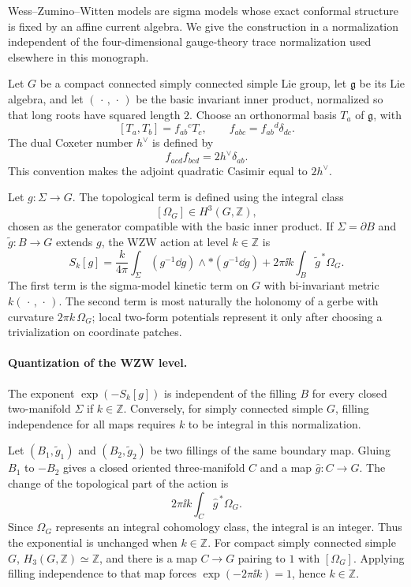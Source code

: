 Wess--Zumino--Witten models are sigma models whose exact conformal structure
is fixed by an affine current algebra.  We give the construction in a
normalization independent of the four-dimensional gauge-theory trace
normalization used elsewhere in this monograph.

Let \(G\) be a compact connected simply connected simple Lie group, let
\(\mathfrak g\) be its Lie algebra, and let \((\,\cdot\,,\,\cdot\,)\) be the
basic invariant inner product, normalized so that long roots have squared
length \(2\).  Choose an orthonormal basis \(T_a\) of \(\mathfrak g\), with
\[
  [T_a,T_b]=f_{ab}{}^{c}T_c,
  \qquad
  f_{abc}=f_{ab}{}^d\delta_{dc}.
\]
The dual Coxeter number \(h^\vee\) is defined by
\begin{equation}
  f_{acd}f_{bcd}=2h^\vee\delta_{ab}.
  \label{eq:wzw-dual-coxeter-normalization}
\end{equation}
This convention makes the adjoint quadratic Casimir equal to \(2h^\vee\).

Let \(g:\Sigma\to G\).  The topological term is defined using the integral
class
\[
  [\Omega_G]\in H^3(G,\mathbb Z),
\]
chosen as the generator compatible with the basic inner product.  If
\(\Sigma=\partial B\) and \(\widetilde g:B\to G\) extends \(g\), the WZW
action at level \(k\in\mathbb Z\) is
\begin{equation}
  S_k[g]
  =
  \frac{k}{4\pi}
  \int_\Sigma
  (g^{-1}\dd g)\wedge * (g^{-1}\dd g)
  +
  2\pi\ii k\int_B \widetilde g^{\,*}\Omega_G .
  \label{eq:wzw-action-coordinate-free}
\end{equation}
The first term is the sigma-model kinetic term on \(G\) with bi-invariant
metric \(k(\,\cdot\,,\,\cdot\,)\).  The second term is most naturally the
holonomy of a gerbe with curvature \(2\pi k\,\Omega_G\); local two-form
potentials represent it only after choosing a trivialization on coordinate
patches.

\paragraph{Quantization of the WZW level.}
The exponent \(\exp(-S_k[g])\) is independent of the filling \(B\) for every
closed two-manifold \(\Sigma\) if \(k\in\mathbb Z\).  Conversely, for simply
connected simple \(G\), filling independence for all maps requires \(k\) to
be integral in this normalization.

Let \((B_1,\widetilde g_1)\) and \((B_2,\widetilde g_2)\) be two fillings of
the same boundary map.  Gluing \(B_1\) to \(-B_2\) gives a closed oriented
three-manifold \(C\) and a map \(\widehat g:C\to G\).  The change of the
topological part of the action is
\[
  2\pi\ii k\int_C\widehat g^{\,*}\Omega_G .
\]
Since \(\Omega_G\) represents an integral cohomology class, the integral is
an integer.  Thus the exponential is unchanged when \(k\in\mathbb Z\).  For
compact simply connected simple \(G\), \(H_3(G,\mathbb Z)\simeq\mathbb Z\),
and there is a map \(C\to G\) pairing to \(1\) with \([\Omega_G]\).  Applying
filling independence to that map forces \(\exp(-2\pi\ii k)=1\), hence
\(k\in\mathbb Z\).

